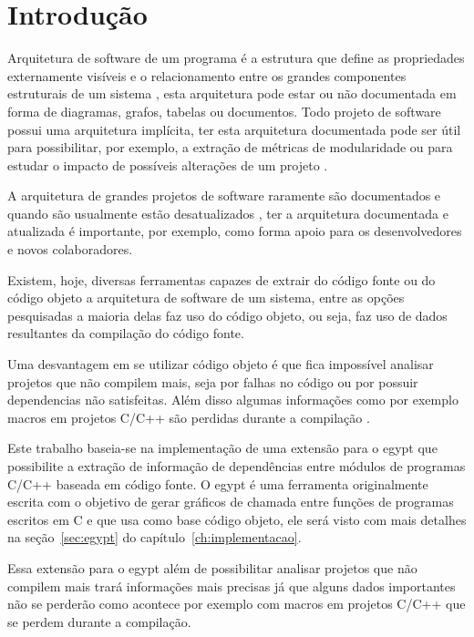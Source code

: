 \chapter{Introdução}

Arquitetura de software de um programa é a estrutura que define as propriedades
externamente visíveis e o relacionamento entre os grandes componentes
estruturais de um sistema \cite{engenhariaDeSoftwarePressman}, esta arquitetura
pode estar ou não documentada em forma de diagramas, grafos, tabelas ou documentos.
Todo projeto de software possui uma arquitetura implícita, ter esta arquitetura
documentada pode ser útil para possibilitar, por exemplo, a extração de
métricas de modularidade ou para estudar o impacto de possíveis alterações de
um projeto \cite{mata26-terceiro-projeto-piloto}.

A arquitetura de grandes projetos de software raramente são documentados e
quando são usualmente estão desatualizados
\cite{sourceVersusObjectCodeExtraction}, ter a arquitetura documentada e
atualizada é importante, por exemplo, como forma apoio para os desenvolvedores
e novos colaboradores.

Existem, hoje, diversas ferramentas capazes de extrair do código fonte ou do
código objeto a arquitetura de software de um sistema, entre as opções
pesquisadas \cite{sourceVersusObjectCodeExtraction} a maioria delas faz uso do
código objeto, ou seja, faz uso de dados resultantes da compilação do código
fonte.

Uma desvantagem em se utilizar código objeto é que fica impossível
analisar projetos que não compilem mais, seja por falhas no código ou por
possuir dependencias não satisfeitas. Além disso algumas informações como por
exemplo macros em projetos C/C++ são perdidas durante a
compilação \cite{sourceVersusObjectCodeExtraction}.

Este trabalho baseia-se na implementação de uma extensão para o egypt que
possibilite a extração de informação de dependências entre módulos de programas
C/C++ baseada em código fonte. O egypt é uma ferramenta originalmente escrita
com o objetivo de gerar gráficos de chamada entre funções de programas escritos
em C e que usa como base código objeto, ele será visto com mais detalhes na
seção~\ref{sec:egypt} do capítulo~\ref{ch:implementacao}.

Essa extensão para o egypt além de possibilitar analisar projetos que não
compilem mais trará informações mais precisas já que alguns dados importantes
não se perderão como acontece por exemplo com macros em projetos C/C++
\cite{sourceVersusObjectCodeExtraction} que se perdem durante a compilação.

